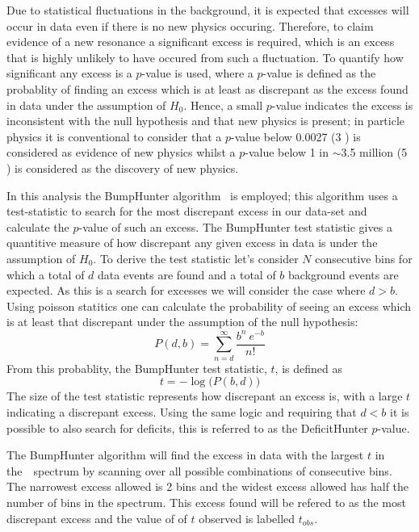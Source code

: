 Due to statistical fluctuations in the background,
it is expected that excesses will occur in data even if there is no new physics occuring.
Therefore, to claim evidence of a new resonance a significant excess is required,
which is an excess that is highly unlikely to have occured from such a fluctuation.
To quantify how significant any excess is a $p$-value is used,
where a $p$-value is defined as the probablity of finding an excess which is at least as discrepant as the excess found in data
under the assumption of $H_0$.
Hence, a small $p$-value indicates the excess is inconsistent with the null hypothesis and that new physics is present;
in particle physics it is conventional to consider that a $p$-value below 0.0027 (3 \sigma) is considered as evidence of new physics
whilst a $p$-value below 1 in $\sim$3.5 million (5 \sigma) is considered as the discovery of new physics.

In this analysis the {\sc BumpHunter} algorithm~\cite{dibjet-bh} is employed;
this algorithm uses a test-statistic to 
search for the most discrepant excess in our data-set
and calculate the $p$-value of such an excess.
The BumpHunter test statistic gives a quantitive measure of how discrepant any given excess in data is
under the assumption of $H_0$.
To derive the test statistic let's consider $N$ consecutive bins for which
a total of $d$ data events are found and a total of $b$ background events are expected.
As this is a search for excesses we will consider the case where $d > b$.
Using poisson statitics one can calculate the probability of seeing an excess which is at least that discrepant
under the assumption of the null hypothesis:
\begin{equation}
  P(d,b) = \sum_{n=d}^{\infty} \frac{b^n~e^{-b}}{n!}
\end{equation}
From this probablity, the BumpHunter test statistic, $t$, is defined as
\begin{equation}
 t = -\log{\big(P(b,d)\big)}
\end{equation}
The size of the test statistic represents how discrepant an excess is,
with a large $t$ indicating a discrepant excess.
Using the same logic and requiring that $d < b$ it is possible to also search for deficits,
this is referred to as the DeficitHunter $p$-value.

The BumpHunter algorithm will find the excess in data with the largest $t$ in the~\mjj~spectrum
by scanning over all possible combinations of consecutive bins.
The narrowest excess allowed is 2 bins and the widest excess allowed has half the number of bins in the spectrum.
This excess found will be refered to as the most discrepant excess and the value of of $t$ observed is labelled $t_{obs}$.


